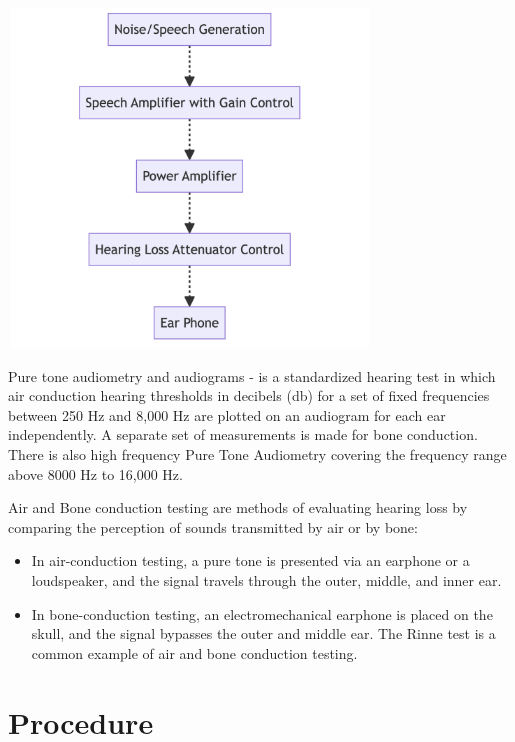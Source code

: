 \documentclass[
  11pt,
  letterpaper,
  DIV=11,
  numbers=noendperiod]{scrreprt}
\begin{document}
\begin{center}
\includegraphics[width=3.79167in,height=3.54167in]{images/clipboard-689549047.png}
\end{center}

Pure tone audiometry and audiograms - is a standardized hearing test in
which air conduction hearing thresholds in decibels (db) for a set of
fixed frequencies between 250 Hz and 8,000 Hz are plotted on an
audiogram for each ear independently. A separate set of measurements is
made for bone conduction. There is also high frequency Pure Tone
Audiometry covering the frequency range above 8000 Hz to 16,000 Hz.

Air and Bone conduction testing are methods of evaluating hearing loss
by comparing the perception of sounds transmitted by air or by bone:

\begin{itemize}
\item
  In air-conduction testing, a pure tone is presented via an earphone or
  a loudspeaker, and the signal travels through the outer, middle, and
  inner ear.
\item
  In bone-conduction testing, an electromechanical earphone is placed on
  the skull, and the signal bypasses the outer and middle ear. The Rinne
  test is a common example of air and bone conduction testing.
\end{itemize}

\section{Procedure}\label{procedure-4}
\end{document}
